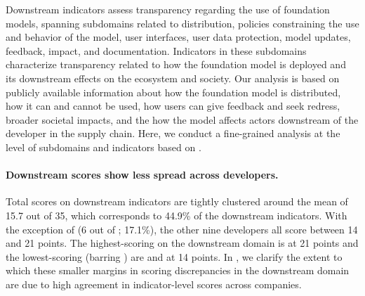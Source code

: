 \documentclass[screen, authorversion, acmsmall]{acmart}
\begin{document}
Downstream indicators assess transparency regarding the use of foundation models, spanning subdomains related to distribution, policies constraining the use and behavior of the model, user interfaces, user data protection, model updates, feedback, impact, and documentation. 
Indicators in these subdomains characterize transparency related to how the foundation model is deployed and its downstream effects on the ecosystem and society. 
Our analysis is based on publicly available information about how the foundation model is distributed, how it can and cannot be used, how users can give feedback and seek redress, broader societal impacts, and the how the model affects actors downstream of the developer in the supply chain.
Here, we conduct a fine-grained analysis at the level of subdomains and indicators based on .

\paragraph{Downstream scores show less spread across developers.}
Total scores on downstream indicators are tightly clustered around the mean of 15.7 out of 35, which corresponds to 44.9\% of the \numdownstreamindicators downstream indicators. 
With the exception of \amazon (6 out of \numdownstreamindicators; 17.1\%), the other nine developers all score between 14 and 21 points.
The highest-scoring on the downstream domain is \openai at 21 points and the lowest-scoring (barring \amazon) are \aitwentyone and \inflection at 14 points.
In , we clarify the extent to which these smaller margins in scoring discrepancies in the downstream domain are due to high agreement in indicator-level scores across companies.
\end{document}
